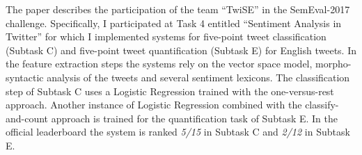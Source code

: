 The paper describes the participation of the team ``TwiSE'' in the SemEval-2017 challenge. Specifically, I participated at Task 4 entitled ``Sentiment Analysis in Twitter'' for which I implemented systems for five-point tweet classification (Subtask C) and five-point tweet quantification (Subtask E) for English tweets. In the feature extraction steps the systems rely on the vector space model, morpho-syntactic analysis of the tweets and several sentiment lexicons. The classification step of Subtask C uses a Logistic Regression trained with the one-versus-rest approach. Another instance of Logistic Regression combined with the classify-and-count approach is trained for the quantification task of Subtask E. In the official leaderboard the system is ranked \textit{5/15} in Subtask C and \textit{2/12} in Subtask E.
